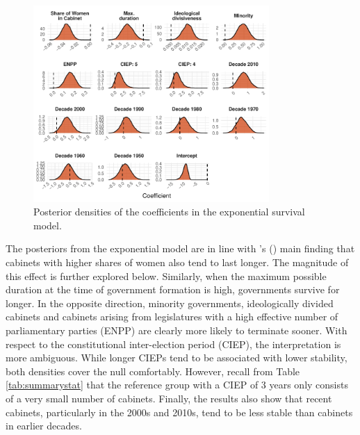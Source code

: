 \documentclass[11pt]{article}
\newcommand\possecite[1]{\citeauthor{#1}'s (\citeyear{#1})}
\newcommand\minp[1]{\begin{minipage}{0.8\textwidth} #1 \end{minipage}}
\begin{document}
\begin{figure}[!ht]
    \centering
    \minp{\caption{Posterior densities of the coefficients in the exponential survival model.} \label{fig:exp_coefplot}}
    \includegraphics[width = 0.8\textwidth]{figures/fig1_exp_coefplot.pdf}
\end{figure}

The posteriors from the exponential model are in line with \possecite{KK20} main finding that cabinets with higher shares of women also tend to last longer. The magnitude of this effect is further explored below. Similarly, when the maximum possible duration at the time of government formation is high, governments survive for longer. In the opposite direction, minority governments, ideologically divided cabinets and cabinets arising from legislatures with a high effective number of parliamentary parties (ENPP) are clearly more likely to terminate sooner. With respect to the constitutional inter-election period (CIEP), the interpretation is more ambiguous. While longer CIEPs tend to be associated with lower stability, both densities cover the null comfortably. However, recall from Table \ref{tab:summarystat} that the reference group with a CIEP of 3 years only consists of a very small number of cabinets. Finally, the results also show that recent cabinets, particularly in the 2000s and 2010s, tend to be less stable than cabinets in earlier decades. 
\end{document}
